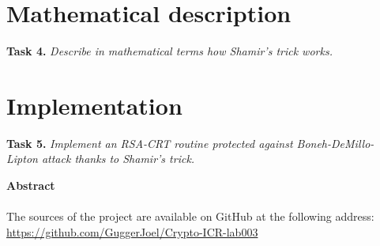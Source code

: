 \documentclass[a4paper]{report}
\begin{document}
\section{Mathematical description}
\textbf{Task 4.} \textit{Describe in mathematical terms how Shamir’s trick works.}

\section{Implementation}
\textbf{Task 5.} \textit{Implement an RSA-CRT routine protected against Boneh-DeMillo-Lipton attack thanks to Shamir’s trick.}


\newpage
\vspace*{6 cm}
\begin{center}
\textbf{Abstract} \\
\ \\
The sources of the project are available on GitHub at the following address: \\
\href{https://github.com/GuggerJoel/Crypto-ICR-lab003}{\url{https://github.com/GuggerJoel/Crypto-ICR-lab003}}
\end{center}
\end{document}

